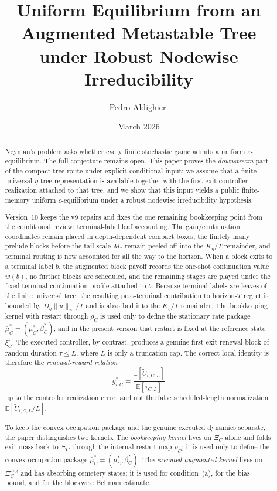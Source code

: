 \documentclass[12pt]{article}
\title{\textbf{Uniform Equilibrium from an Augmented Metastable Tree\\under Robust Nodewise Irreducibility}}
\author{Pedro Aldighieri}
\date{March 2026}
\theoremstyle{definition}
\newcommand{\eps}{\varepsilon}
\newcommand{\E}{\mathbb{E}}
\newcommand{\1}{\mathbf{1}}
\begin{document}
\maketitle



\begin{abstract}
Neyman's problem asks whether every finite stochastic game admits a uniform
$\eps$-equilibrium. The full conjecture remains open. This paper proves the
\emph{downstream} part of the compact-tree route under explicit conditional input:
we assume that a finite universal $\eta$-tree representation is available together
with the first-exit controller realization attached to that tree, and we show that
this input yields a public finite-memory uniform $\eps$-equilibrium under a robust
nodewise irreducibility hypothesis.

Version~10 keeps the v9 repairs and fixes the one remaining bookkeeping
point from the conditional review: terminal-label leaf accounting. The
gain/continuation coordinates remain placed in depth-dependent compact boxes, the
finitely many prelude blocks before the tail scale $M_*$ remain peeled off into
the $K_\eta/T$ remainder, and terminal routing is now accounted for all the way
to the horizon. When a block exits to a terminal label $b$, the augmented block
payoff records the one-shot continuation value $w(b)$, no further blocks are
scheduled, and the remaining stages are played under the fixed terminal
continuation profile attached to $b$. Because terminal labels are leaves of the
finite universal tree, the resulting post-terminal contribution to horizon-$T$
regret is bounded by $D_\eta\|u\|_\infty/T$ and is absorbed into the
$K_\eta/T$ remainder. The bookkeeping kernel with restart through $\rho_C$ is
used only to define the stationary rate package
$\bar\mu_C^*=(\mu_C^*,\beta_C^*)$, and in the present version that restart is
fixed at the reference state $\xi_C^\circ$. The executed controller, by
contrast, produces a genuine first-exit renewal block of random duration
$\tau\le L$, where $L$ is only a truncation cap. The correct local identity is
therefore the \emph{renewal-reward relation}
\[
g_{i,C}^*
=
\frac{\E[\widetilde U_{i,C,L}]}{\E[\tau_{C,L}]}
\]
up to the controller realization error, and not the false scheduled-length
normalization $\E[\widetilde U_{i,C,L}/L]$.

To keep the convex occupation package and the genuine executed dynamics separate,
the paper distinguishes two kernels. The \emph{bookkeeping kernel} lives on
$\Xi_C$ alone and folds exit mass back to $\Xi_C$ through the internal restart map
$\rho_C$; it is used only to define the convex occupation package
$\bar\mu_C^*=(\mu_C^*,\beta_C^*)$. The \emph{executed augmented kernel} lives on
$\Xi_C^{\mathrm{aug}}$ and has absorbing cemetery states; it is used for
condition~\textnormal{(a)}, for the bias bound, and for the blockwise Bellman
estimate.


\end{abstract}
\end{document}
